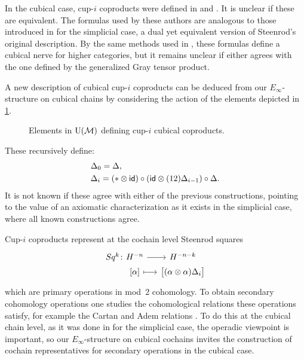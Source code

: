In the cubical case, cup-$i$ coproducts were defined in \cite{kadeishvili1999coproducts} and \cite{pilarczyk2016cubical}.
It is unclear if these are equivalent.
The formulas used by these authors are analogous to those introduced in \cite{medina2021fast_sq} for the simplicial case, a dual yet equivalent version of Steenrod's original description.
By the same methods used in \cite{medina2020globular}, these formulas define a cubical nerve for higher categories, but it remains unclear if either agrees with the one defined by the generalized Gray tensor product.

A new description of cubical cup-$i$ coproducts can be deduced from our $E_\infty$-structure on cubical chains by considering the action of the elements depicted in \cref{f:cup-i}.
\begin{figure}
	
	\caption{Elements in ${\operatorname{U}(\mathcal{M})}$ defining cup-$i$ cubical coproducts.}
	\label{f:cup-i}
\end{figure}
These recursively define:
\begin{equation} \label{e:prop cup-i}
	\begin{split}
		& \Delta_0 = \Delta, \\
		& \Delta_i =
		(\ast \otimes \mathsf{id}) \circ (\mathsf{id} \otimes (12) \Delta_{i-1}) \circ \Delta.
	\end{split}
\end{equation}
It is not known if these agree with either of the previous constructions, pointing to the value of an axiomatic characterization as it exists in the simplicial case, where all known constructions agree.

Cup-$i$ coproducts represent at the cochain level Steenrod squares
\[
\begin{tikzcd} [column sep=small, row sep=0]
	Sq^k \colon &[-20] H^{-n} \arrow[r] & H^{-n-k} \\ &
	{[\alpha]} \arrow[r, mapsto] & \big[ (\alpha \ot \alpha) \Delta_i \big]
\end{tikzcd}
\]
which are primary operations in mod~2 cohomology.
To obtain secondary cohomology operations one studies the cohomological relations these operations satisfy, for example the Cartan and Adem relations \cite{steenrod1962cohomology}.
To do this at the cubical chain level, as it was done in \cite{medina2020cartan,medina2021adem} for the simplicial case, the operadic viewpoint is important, so our $E_\infty$-structure on cubical cochains invites the construction of cochain representatives for secondary operations in the cubical case.

